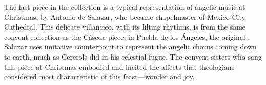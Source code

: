 The last piece in the collection is a typical representation of angelic music 
at Christmas, by Antonio de Salazar, who became chapelmaster of Mexico City 
Cathedral.%
    \Autocite[29--34]{Cashner:PhD}
This delicate villancico, with its lilting rhythms, is from the same convent 
collection as the Cáseda piece, in Puebla de los Ángeles, the original
.  
Salazar uses imitative counterpoint to represent the angelic chorus coming down 
to earth, much as Cererols did in his celestial fugue. 
The convent sisters who sang this piece at Christmas embodied and incited the 
affects that theologians considered most characteristic of this feast---wonder
and joy.


